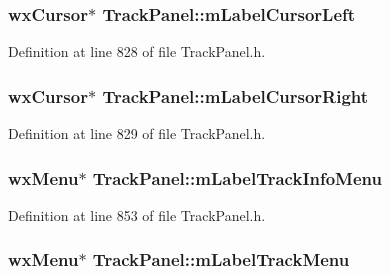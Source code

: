 \subsubsection[{\texorpdfstring{m\+Label\+Cursor\+Left}{mLabelCursorLeft}}]{\setlength{\rightskip}{0pt plus 5cm}wx\+Cursor$\ast$ Track\+Panel\+::m\+Label\+Cursor\+Left\hspace{0.3cm}{\ttfamily [protected]}}\hypertarget{class_track_panel_a35f8f3d317049476e9aa1beff2a4fcfe}{}\label{class_track_panel_a35f8f3d317049476e9aa1beff2a4fcfe}


Definition at line 828 of file Track\+Panel.\+h.

\subsubsection[{\texorpdfstring{m\+Label\+Cursor\+Right}{mLabelCursorRight}}]{\setlength{\rightskip}{0pt plus 5cm}wx\+Cursor$\ast$ Track\+Panel\+::m\+Label\+Cursor\+Right\hspace{0.3cm}{\ttfamily [protected]}}\hypertarget{class_track_panel_a24629f89f4075b5592bccf528b0b9ed7}{}\label{class_track_panel_a24629f89f4075b5592bccf528b0b9ed7}


Definition at line 829 of file Track\+Panel.\+h.

\subsubsection[{\texorpdfstring{m\+Label\+Track\+Info\+Menu}{mLabelTrackInfoMenu}}]{\setlength{\rightskip}{0pt plus 5cm}wx\+Menu$\ast$ Track\+Panel\+::m\+Label\+Track\+Info\+Menu\hspace{0.3cm}{\ttfamily [protected]}}\hypertarget{class_track_panel_a7f2c4b61e416d1cbfcddeee6d96a2da1}{}\label{class_track_panel_a7f2c4b61e416d1cbfcddeee6d96a2da1}


Definition at line 853 of file Track\+Panel.\+h.

\subsubsection[{\texorpdfstring{m\+Label\+Track\+Menu}{mLabelTrackMenu}}]{\setlength{\rightskip}{0pt plus 5cm}wx\+Menu$\ast$ Track\+Panel\+::m\+Label\+Track\+Menu\hspace{0.3cm}{\ttfamily [protected]}}\hypertarget{class_track_panel_ac64f12dd879989b2b08b7b99de33bfaf}{}\label{class_track_panel_ac64f12dd879989b2b08b7b99de33bfaf}


